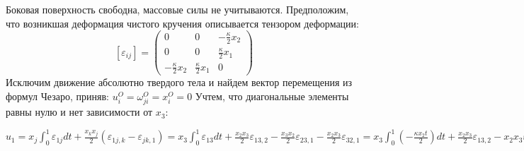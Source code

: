 \begin{figure}[h!]
  \centering
\end{figure}


Боковая
поверхность свободна, массовые силы не учитываются. Предположим, что
возникшая деформация чистого кручения описывается тензором деформации:
$$
\left[\varepsilon_{i j}\right]=\left(\begin{array}{ccc}
0 & 0 & -\frac{\kappa}{2} x_2 \\
0 & 0 & \frac{\kappa}{2} x_1 \\
-\frac{\kappa}{2} x_2 & \frac{\kappa}{2} x_1 & 0
\end{array}\right)
$$
Исключим движение абсолютно твердого тела
и найдем вектор перемещения из формул Чезаро, приняв: $u_i^O=\omega_{ji}^O=x_i^O=0$
Учтем, что диагональные элементы равны нулю и нет зависимости от $x_3$:


$ \displaystyle
u_1=x_j \int_0^1 \varepsilon_{1 j} d t+\frac{x_k x_j}{2}\left(\varepsilon_{1 j, k}-\varepsilon_{j k, 1}\right)=x_3 \int_0^1 \varepsilon_{13} d t+\frac{x_2 x_3}{2} \varepsilon_{13,2}-\frac{x_3 x_2}{2} \varepsilon_{23,1}-\frac{x_2 x_3}{2} \varepsilon_{32,1}
=x_3 \int_0^1\left(-\frac{\kappa x_2 t}{2}\right) d t+\frac{x_2 x_3}{2} \varepsilon_{13,2}-x_2 x_3 \varepsilon_{23,1}=\frac{-\kappa}{2} x_2 x_3 \int_0^1 t d t-\frac{\kappa}{2} \frac{x_2 x_3}{2}-\frac{\kappa}{2} x_2 x_3=\left(-\frac{1}{2} \frac{1}{2}-\frac{1}{4}-\frac{1}{2}\right) \kappa x_2 x_3=-\kappa x_2 x_3$



